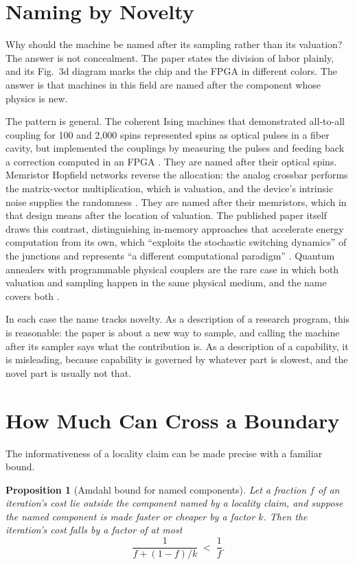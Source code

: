 \documentclass[11pt]{article}
\newtheorem{proposition}{Proposition}
\theoremstyle{definition}
\theoremstyle{remark}
\begin{document}
\section{Naming by Novelty}

Why should the machine be named after its sampling rather than its valuation? The answer is not concealment. The paper states the division of labor plainly, and its Fig.~3d diagram marks the chip and the FPGA in different colors. The answer is that machines in this field are named after the component whose physics is new.

The pattern is general. The coherent Ising machines that demonstrated all-to-all coupling for 100 and 2,000 spins represented spins as optical pulses in a fiber cavity, but implemented the couplings by measuring the pulses and feeding back a correction computed in an FPGA \cite{mcmahon2016,inagaki2016}. They are named after their optical spins. Memristor Hopfield networks reverse the allocation: the analog crossbar performs the matrix-vector multiplication, which is valuation, and the device's intrinsic noise supplies the randomness \cite{cai2020}. They are named after their memristors, which in that design means after the location of valuation. The published paper itself draws this contrast, distinguishing in-memory approaches that accelerate energy computation from its own, which ``exploits the stochastic switching dynamics'' of the junctions and represents ``a different computational paradigm'' \cite{li2026}. Quantum annealers with programmable physical couplers are the rare case in which both valuation and sampling happen in the same physical medium, and the name covers both \cite{johnson2011}.

In each case the name tracks novelty. As a description of a research program, this is reasonable: the paper is about a new way to sample, and calling the machine after its sampler says what the contribution is. As a description of a capability, it is misleading, because capability is governed by whatever part is slowest, and the novel part is usually not that.

\section{How Much Can Cross a Boundary}

The informativeness of a locality claim can be made precise with a familiar bound.

\begin{proposition}[Amdahl bound for named components]
Let a fraction $f$ of an iteration's cost lie outside the component named by a locality claim, and suppose the named component is made faster or cheaper by a factor $k$. Then the iteration's cost falls by a factor of at most
\begin{equation}
\frac{1}{f + (1 - f)/k} \;<\; \frac{1}{f}.
\end{equation}
\end{proposition}
\end{document}
